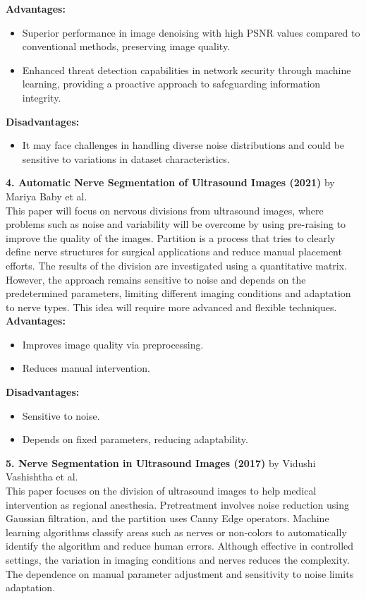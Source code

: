 \documentclass[12pt]{article}
\begin{document}
\textbf{Advantages:}
\begin{itemize}
    \item Superior performance in image denoising with high PSNR values compared to conventional methods, preserving image quality.
    \item Enhanced threat detection capabilities in network security through machine learning, providing a proactive approach to safeguarding information integrity.
\end{itemize}

\textbf{Disadvantages:}
\begin{itemize}
    \item It may face challenges in handling diverse noise distributions and could be sensitive to variations in dataset characteristics.
\end{itemize}

\noindent \textbf{4. Automatic Nerve Segmentation of Ultrasound Images (2021)} by Mariya Baby et al.\\
This paper
will focus on nervous divisions from ultrasound images, where problems such as noise and variability will be overcome by using pre-raising to improve the quality of the images. Partition is
a process that tries to clearly define nerve structures for surgical applications and reduce manual
placement efforts. The results of the division are investigated using a quantitative matrix. However,
the approach remains sensitive to noise and depends on the predetermined parameters, limiting different imaging conditions and adaptation to nerve types. This idea will require more advanced and
flexible techniques.\\

\textbf{Advantages:}
\begin{itemize}
    \item Improves image quality via preprocessing.
    \item Reduces manual intervention.
\end{itemize}
\newpage
\textbf{Disadvantages:}
\begin{itemize}
    \item Sensitive to noise.
    \item Depends on fixed parameters, reducing adaptability.
\end{itemize}

\vspace{10pt}

\noindent \textbf{5. Nerve Segmentation in Ultrasound Images (2017)} by Vidushi Vashishtha et al.\\
This paper focuses
on the division of ultrasound images to help medical intervention as regional anesthesia. Pretreatment involves noise reduction using Gaussian filtration, and the partition uses Canny Edge
operators. Machine learning algorithms classify areas such as nerves or non-colors to automatically identify the algorithm and reduce human errors. Although effective in controlled settings, the
variation in imaging conditions and nerves reduces the complexity. The dependence on manual
parameter adjustment and sensitivity to noise limits adaptation.\\
\end{document}

